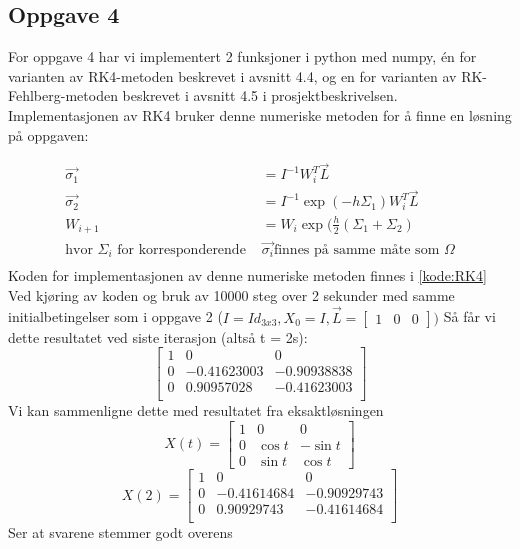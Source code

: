 \subsection{Oppgave 4}
\label{section:oppgave4}
For oppgave 4 har vi implementert 2 funksjoner i python med numpy, én for varianten av RK4-metoden beskrevet i avsnitt 4.4, og en for varianten av RK-Fehlberg-metoden beskrevet i avsnitt 4.5 i prosjektbeskrivelsen.\newline \newline
Implementasjonen av RK4 bruker denne numeriske metoden for å finne en løsning på oppgaven: \newline

$$
\begin{aligned}
\vec{\sigma_1} &= I^{-1}W_i^T \vec{L} \\
\vec{\sigma_2} &= I^{-1}\exp{(-h\Sigma_1)}W_i^T \vec{L} \\
W_{i+1} &= W_i \exp{(\frac{h}{2}(\Sigma_1 + \Sigma_2)} \\
\text{hvor } \Sigma_i \text{ for korresponderende }& \vec{\sigma_i} \text{finnes på samme måte som } \Omega \\
\end{aligned}
$$
Koden for implementasjonen av denne numeriske metoden finnes i \ref{kode:RK4} \newline 
Ved kjøring av koden og bruk av 10000 steg over 2 sekunder med samme initialbetingelser som i oppgave 2 ($I=Id_{3x3}, X_0 = I, \vec{L} = \begin{bmatrix} 1 & 0 & 0\end{bmatrix})$ Så får vi dette resultatet ved siste iterasjon (altså t = 2s):\newline
$$
\begin{bmatrix}
1&0&0\\
0&-0.41623003&-0.90938838\\
0&0.90957028&-0.41623003\\
\end{bmatrix}
$$
Vi kan sammenligne dette med resultatet fra eksaktløsningen \newline
$$
    X(t)=\begin{bmatrix}1&0&0\\0&\cos t&-\sin t\\0&\sin t&\cos t\end{bmatrix}
$$
$$
    X(2) =     
    \begin{bmatrix}
    1 & 0 & 0\\
    0 & -0.41614684 & -0.90929743\\
    0 & 0.90929743 & -0.41614684\\
    \end{bmatrix}
$$ \newline Ser at svarene stemmer godt overens \newline \newline
